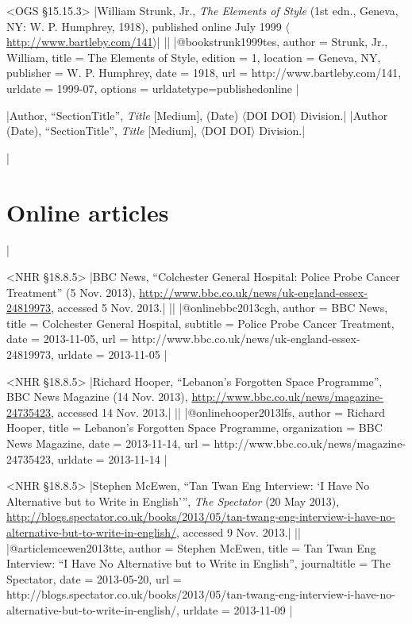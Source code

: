 \documentclass[extrafontsizes,11pt,a4paper,oneside]{memoir}
\newcommand*{\lit}[1]{\textsf{#1}}
\begin{document}
\bibexample<OGS \S15.15.3>
|William Strunk, Jr., \emph{The Elements of Style} (1st edn., Geneva, NY: W. P. Humphrey, 1918), published online July 1999 $\langle$\url{http://www.bartleby.com/141}$\rangle$|%
||%
|@book{strunk1999tes,
  author = {Strunk, Jr., William},
  title = {The Elements of Style},
  edition = {1},
  location = {Geneva, NY},
  publisher = {W. P. Humphrey},
  date = {1918},
  url = {http://www.bartleby.com/141},
  urldate = {1999-07},
  options = {urldatetype=published{\space}online}
}|

\specs
|Author, \enquote{SectionTitle}, \emph{Title} [Medium], (Date) $\langle$\lit{DOI} DOI$\rangle$ Division.|%
|Author (Date), \enquote{SectionTitle}, \emph{Title} [Medium], $\langle$\lit{DOI} DOI$\rangle$ Division.|

\todoc|
\section{Online articles}
|

\bibexample<NHR \S18.8.5>
|BBC News, \enquote{Colchester General Hospital: Police Probe Cancer Treatment} (5 Nov. 2013), \url{http://www.bbc.co.uk/news/uk-england-essex-24819973}, accessed 5 Nov. 2013.|%
||%
|@online{bbc2013cgh,
  author = {{BBC News}},
  title = {Colchester General Hospital},
  subtitle = {Police Probe Cancer Treatment},
  date = {2013-11-05},
  url = {http://www.bbc.co.uk/news/uk-england-essex-24819973},
  urldate = {2013-11-05}
}|

\bibexample<NHR \S18.8.5>
|Richard Hooper, \enquote{Lebanon's Forgotten Space Programme}, BBC News Magazine (14 Nov. 2013), \url{http://www.bbc.co.uk/news/magazine-24735423}, accessed 14 Nov. 2013.|%
||%
|@online{hooper2013lfs,
  author = {Richard Hooper},
  title = {Lebanon's Forgotten Space Programme},
  organization = {BBC News Magazine},
  date = {2013-11-14},
  url = {http://www.bbc.co.uk/news/magazine-24735423},
  urldate = {2013-11-14}
}|

\bibexample<NHR \S18.8.5>
|Stephen McEwen, \enquote{Tan Twan Eng Interview: \enquote{I Have No Alternative but to Write in English}}, \emph{The Spectator} (20 May 2013), \url{http://blogs.spectator.co.uk/books/2013/05/tan-twang-eng-interview-i-have-no-alternative-but-to-write-in-english/}, accessed 9 Nov. 2013.|%
||%
|@article{mcewen2013tte,
  author = {Stephen McEwen},
  title = {Tan Twan Eng Interview: \enquote{I Have No Alternative but to Write in English}},
  journaltitle = {The Spectator},
  date = {2013-05-20},
  url = {http://blogs.spectator.co.uk/books/2013/05/tan-twang-eng-interview-i-have-no-alternative-but-to-write-in-english/},
  urldate = {2013-11-09}
}|
\end{document}
